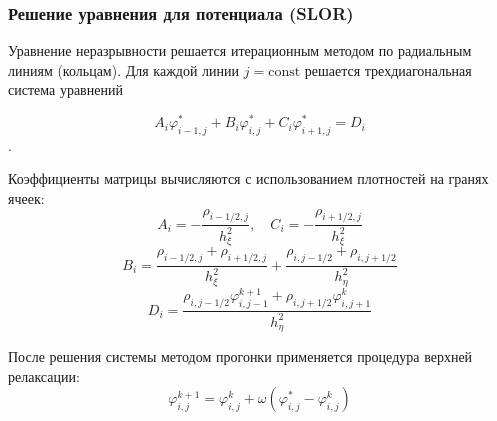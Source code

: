 \subsubsection{Решение уравнения для потенциала (SLOR)}
Уравнение неразрывности решается итерационным методом по радиальным линиям (кольцам). Для каждой линии $j = \text{const}$ решается трехдиагональная система уравнений 

\[A_i \varphi_{i-1,j}^* + B_i \varphi_{i,j}^* + C_i \varphi_{i+1,j}^* = D_i\].

Коэффициенты матрицы вычисляются с использованием плотностей на гранях ячеек:
\[ A_i = -\frac{\rho_{i-1/2, j}}{h_\xi^2}, \quad C_i = -\frac{\rho_{i+1/2, j}}{h_\xi^2} \]
\[ B_i = \frac{\rho_{i-1/2, j} + \rho_{i+1/2, j}}{h_\xi^2} + \frac{\rho_{i, j-1/2} + \rho_{i, j+1/2}}{h_\eta^2} \]
\[ D_i = \frac{\rho_{i, j-1/2} \varphi_{i, j-1}^{k+1} + \rho_{i, j+1/2} \varphi_{i, j+1}^k}{h_\eta^2} \]

После решения системы методом прогонки применяется процедура верхней релаксации:
\[ \varphi_{i,j}^{k+1} = \varphi_{i,j}^k + \omega \left( \varphi_{i,j}^* - \varphi_{i,j}^k \right) \]
